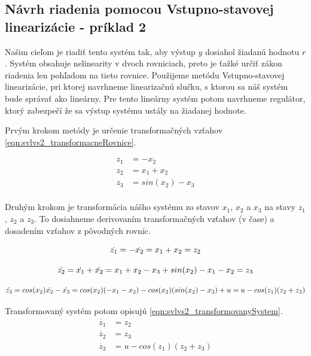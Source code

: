 \documentclass[../main.tex]{subfiles}
\begin{document}
\newpage
\subsection*{Návrh riadenia pomocou Vstupno-stavovej linearizácie - príklad 2}

	Našim cieľom je riadiť tento systém tak, aby výstup $y$ dosiahol žiadanú hodnotu $r$. Systém obsahuje nelinearity v dvoch rovniciach, preto je ťažké určiť zákon riadenia len pohľadom na tieto rovnice. Použijeme metódu Vstupno-stavovej linearizácie, pri ktorej navrhneme linearizačnú slučku, s ktorou sa náš systém bude správať ako lineárny. Pre tento lineárny systém potom navrhneme regulátor, ktorý zabezpečí že sa výstup systému ustály na žiadanej hodnote.

Prvým krokom metódy je určenie transformačných vzťahov \cref{eqn:svlvs2_transformacneRovnice}.

	\begin{equation}
		\begin{aligned}
		z_1 &= -x_2 													\\
		z_2 &= x_1 + x_2												\\
		z_3 &= sin(x_2) - x_3 											\\
		\end{aligned}
		\label{eqn:svlvs2_transformacneRovnice}
	\end{equation}

Druhým krokom je transformácia nášho systému zo stavov $x_1$, $x_2$ a $x_3$ na stavy $z_1$, $z_2$ a $z_3$. To dosiahneme derivovaním transformačných vzťahov (v čase) a dosadením vzťahov z pôvodných rovníc.

	\begin{equation}
		\dot{z_1} = -\dot{x_2} = x_1 + x_2 =  z_2 								\\
	\end{equation}

	\begin{equation}
		\dot{z_2} = \dot{x_1} + \dot{x_2} = x_1 + x_2 - x_3 + sin(x_2) - x_1 - x_2  = z_3 	\\
	\end{equation}

	\begin{equation}
		\dot{z_3} = cos(x_2)\dot{x_2} - \dot{x_3} = cos(x_2)(-x_1 -x_2) -cos(x_2)(sin(x_2) - x_3) + u = u - cos(z_1)(z_2+z_3) 	\\
	\end{equation}
	
	Transformovaný systém potom opisujú  \cref{eqn:svlvs2_transformovanySystem}.
	\begin{equation}
		\begin{aligned}
		\dot{z_1} &=  z_2												\\
		\dot{z_2} &=  z_3												\\
		\dot{z_3} &=  u - cos(z_1)(z_2+z_3)									\\
		\end{aligned}
		\label{eqn:svlvs2_transformovanySystem}
	\end{equation}
\end{document}
